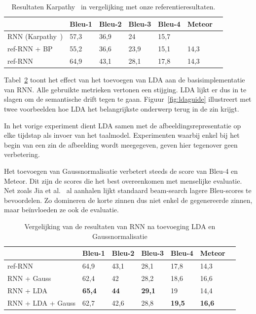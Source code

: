 \begin{table}
	\centering
	\begin{tabular}{lllllll}
		& Bleu-1 & Bleu-2 & Bleu-3 & Bleu-4 & Meteor \\ \hline
		RNN (Karpathy~\cite{Karpathy2015})    & 57,3   & 36,9   & 24     & 15,7   & ~           \\    
		ref-RNN + BP     & 55,2   & 36,6   & 23,9   & 15,1   & 14,3          \\
		ref-RNN          & 64,9  & 43,1     & 28,1   & 17,8   & 14,3          \\\hline
	\end{tabular}

	\caption{Resultaten Karpathy~\cite{Karpathy2015} in vergelijking met onze referentieresultaten.}
	\label{table:karpathy_met_bp}
\end{table}

Tabel~\ref{table:rnn_met_lda} toont het effect van het toevoegen van LDA aan de basisimplementatie van RNN. Alle gebruikte metrieken vertonen een stijging. LDA lijkt er dus in te slagen om de semantische drift tegen te gaan.
Figuur~\ref{fig:ldaguide} illustreert met twee voorbeelden hoe LDA het belangrijkste onderwerp terug in de zin krijgt.

In het vorige experiment dient LDA samen met de afbeeldingsrepresentatie op elke tijdstap als invoer van het taalmodel. Experimenten waarbij enkel bij het begin van een zin de afbeelding wordt meegegeven, geven hier tegenover geen verbetering. 

Het toevoegen van Gaussnormalisatie verbetert steeds de score van Bleu-4 en Meteor. Dit zijn de scores die het best overeenkomen met menselijke evaluatie. Net zoals Jia et al.~\cite{Fernando2015} al aanhalen lijkt standaard beam-search lagere Bleu-scores te bevoordelen. Zo domineren de korte zinnen dus niet enkel de gegenereerde zinnen, maar be\"invloeden ze ook de evaluatie.

\begin{table}
	\centering
	\begin{tabular}{lllllll}
		& Bleu-1 & Bleu-2 & Bleu-3 & Bleu-4 & Meteor \\ \hline
		ref-RNN        & 64,9   & 43,1   & 28,1   & 17,8   & 14,3          \\
		RNN + Gauss       & 62,4   & 42     & 28,2   & 18,6   & 16,6          \\
		RNN + LDA         & \textbf{65,4}   & \textbf{44}     & \textbf{29,1}   & 19     & 14,4          \\
		RNN + LDA + Gauss & 62,7   & 42,6   & 28,8   & \textbf{19,5}   & \textbf{16,6}          \\ \hline
	\end{tabular}
	\caption{Vergelijking van de resultaten van RNN na toevoeging LDA en Gaussnormalisatie}	
	\label{table:rnn_met_lda}
\end{table}

